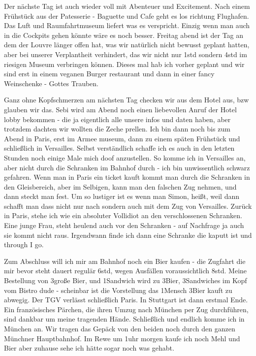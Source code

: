 \documentclass[20pt]{extarticle}
\begin{document}
Der nächste Tag ist auch wieder voll mit Abenteuer und
Excitement. Nach einem Frühstück aus der Patesserie - Baguette und
Cafe geht es los richtung Flughafen. Das Luft und Raumfahrtmuseum
liefert was es verspricht. Einzig wenn man auch in die Cockpits
gehen könnte wäre es noch besser. Freitag abend ist der Tag an dem
der Louvre länger offen hat, was wir natürlich nicht bewusst geplant
hatten, aber bei unserer Verplantheit verhindert, das wir nicht nur
1std sondern 4std im riesigen Museum verbringen können. Dieses mal
hab ich vorher geplant und wir sind erst in einem veganen Burger
restaurant und dann in einer fancy Weinschenke - Gottes
Trauben. \newline

Ganz ohne Kopfschmerzen am nächsten Tag checken wir aus dem Hotel
aus, bzw glauben wir das. Sebi wird am Abend noch einen liebevollen
Anruf der Hotel lobby bekommen - die ja eigentlich alle unsere infos
und daten haben, aber trotzdem dachten wir wollten die Zeche prellen.
Ich bin dann noch bis zum Abend in Paris, erst im Armee museum, dann
zu einem späten Frühstück und schließlich in Versailles. Selbst
verständlich schaffe ich es auch in den letzten Stunden noch einige
Male mich doof anzustellen. So komme ich in Versailles an, aber
nicht durch die Schranken im Bahnhof durch - ich bin unwissentlich
schwarz gefahren. Wenn man in Paris ein ticket kauft kommt man durch
die Schranken in den Gleisbereich, aber im Selbigen, kann man den
falschen Zug nehmen, und dann steckt man fest. Um so lustiger ist es
wenn man Simon, heißt, weil dann schafft man dass nicht nur nach
sondern auch mit dem Zug von Versailles. Zurück in Paris, stehe ich
wie ein absoluter Vollidiot an den verschlossenen Schranken. Eine
junge Frau, steht heulend auch vor den Schranken - auf Nachfrage ja
auch sie kommt nicht raus. Irgendwann finde ich dann eine Schranke
die kaputt ist und through I go. \newline 

Zum Abschluss will ich mir am Bahnhof noch ein Bier kaufen - die
Zugfahrt die mir bevor steht dauert regulär 6std, wegen Ausfällen
voraussichtlich 8std. Meine Bestellung von 3große Bier, und
1Sandwich wird zu 3Bier, 3Sandwiches im Kopf vom Bistro dude -
scheinbar ist die Vorstellung das 1Mensch 3Bier kauft zu
abwegig. Der TGV verlässt schließlich Paris. In Stuttgart ist dann
erstmal Ende. Ein französisches Pärchen, die ihren Umzug nach
München per Zug durchführen, sind dankbar um meine tragenden
Hände. Schließlich und endlich komme ich in München an. Wir tragen
das Gepäck von den beiden noch durch den ganzen Münchner
Hauptbahnhof. Im Rewe um 1uhr morgen kaufe ich noch Mehl und Bier
aber zuhause sehe ich hätte sogar noch was
gehabt. \newline
\end{document}

